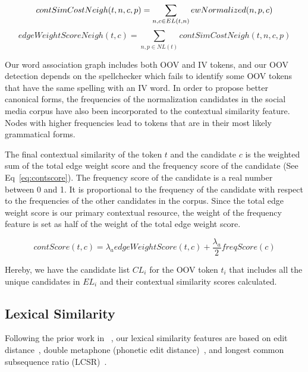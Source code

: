 \documentclass[preprint,review,12pt]{elsarticle}
\begin{document}
\begin{equation}
contSimCostNeigh(t,n,c,p) = \sum_{n,c \in EL(t,n)}{ewNormalized(n,p,c)} \\\\
\label{eq:wscore1}
\end{equation}
\begin{equation}
edgeWeightScoreNeigh(t,c) = \sum_{n,p \in NL(t) }{contSimCostNeigh(t,n,c,p)}
\label{eq:wscore}
\end{equation}

Our word association graph includes both OOV and IV tokens, and our OOV detection depends on the spellchecker which fails to identify some OOV tokens that have the same spelling with an IV word. In order to propose better canonical forms, the frequencies of the normalization candidates in the social media corpus have also been incorporated to the contextual similarity feature. Nodes with higher frequencies lead to tokens that are in their most likely grammatical forms.

The final contextual similarity of the token $t$ and the candidate $c$ is the weighted sum of the total edge weight score and the frequency score of the candidate (See Eq~\ref{eq:contscore}). The frequency score of the candidate is a real number between 0 and 1. It is proportional to the frequency of the candidate with respect to the frequencies of the other candidates in the corpus. Since the total edge weight score is our primary contextual resource, the weight of the frequency feature is set as half of the weight of the total edge weight score.

\begin{equation}
contScore(t,c) = \lambda_a edgeWeightScore(t,c) + \frac{\lambda_a} 2 freqScore(c)
\label{eq:contscore}
\end{equation}

Hereby, we have the candidate list $CL_{i}$ for the OOV token $t_i$ that includes all the unique candidates in $EL_{i}$ and their contextual similarity scores calculated.

\subsection{Lexical Similarity}

Following the prior work in ~\cite{Han:2011:LNS:2002472.2002520,DBLP:conf/acl/HassanM13}, our lexical similarity features are based on edit distance~\cite{levenshtein1966bcc}, double metaphone (phonetic edit distance)~\cite{Philips:2000:DMS:349124.349132}, and longest common subsequence ratio (LCSR)~\cite{Contractor:2010:UCN:1944566.1944588}.
\end{document}
